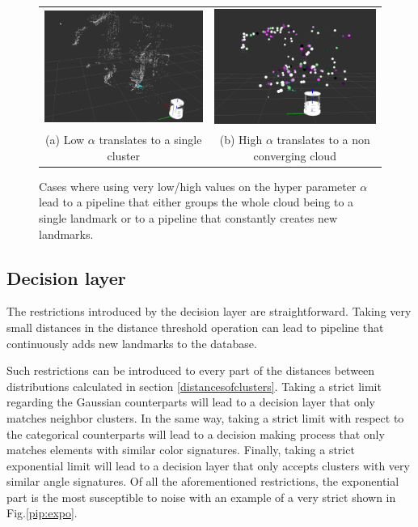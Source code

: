 \documentclass[twoside,hidelinks]{article}
\begin{document}
\begin{figure}
\begin{tabular}{cc}
    \includegraphics[width=.5\textwidth]{singlecluster} &  \includegraphics[width=.5\textwidth]{onlyclusters2} \\
  (a) Low $\alpha$ translates to a single cluster  & (b) High $\alpha$ translates to a non converging cloud \\[6pt]
\end{tabular}
\caption{Cases where using very low/high values on the hyper parameter $\alpha$ lead to a pipeline that either groups the whole cloud being to a single landmark or to a pipeline that constantly creates new landmarks.}
  \label{pip:limits}
\end{figure}

\subsection{Decision layer}

The restrictions introduced by the decision layer are straightforward. Taking very small distances in the distance threshold operation can lead to pipeline that continuously adds new landmarks to the database. 

Such restrictions can be introduced to every part of the distances between distributions calculated in section \ref{distancesofclusters}. Taking a strict limit regarding the Gaussian counterparts will lead to a decision layer that only matches neighbor clusters. In the same way, taking a strict limit with respect to the categorical counterparts will lead to a decision making process that only matches elements with similar color signatures. Finally, taking a strict exponential limit will lead to a decision layer that only accepts clusters with very similar angle signatures. Of all the aforementioned restrictions, the exponential part is the most susceptible to noise with an example of a very strict shown in Fig.\ref{pip:expo}.
\end{document}
